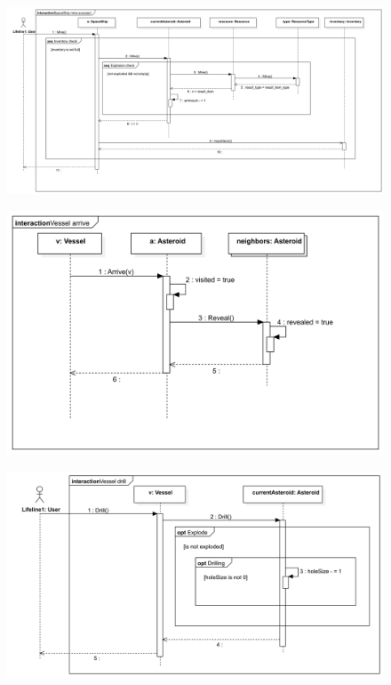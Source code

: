 \documentclass[../../projlab]{subfiles}
\begin{document}
\begin{figure}[H]
	\includegraphics[width=1\textwidth]{docs/2_Project/svg/Design Model!Vessel Actions!SpaceShip mine succeed!SpaceShip mine succeed_13.png}
	\centering
\end{figure}

\begin{figure}[H]
	\includegraphics[width=1\textwidth]{docs/2_Project/svg/Design Model!Vessel Actions!Vessel arrive!Vessel arrive_9.png}
	\centering
\end{figure}

\begin{figure}[H]
	\includegraphics[width=1\textwidth]{docs/2_Project/svg/Design Model!Vessel Actions!Vessel drill!Vessel drill_10.png}
	\centering
\end{figure}
\end{document}
